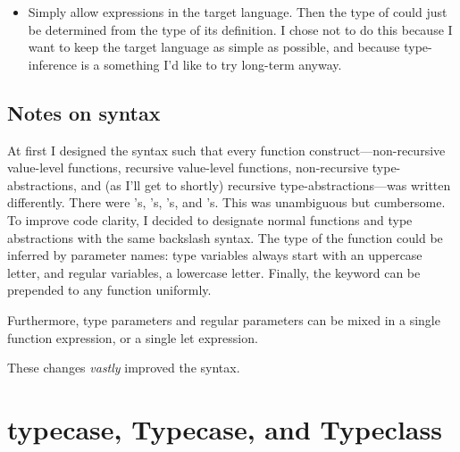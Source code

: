 \documentclass[pageno]{jpaper}
\begin{document}
{{{\begin{itemize}
\begin{lstlisting}
  (\ f => f 73 5)
    (\ (x:Int) (\ (y:Int) => x + y))
\end{lstlisting}

the type inference algorithm would figure out that  must have type  because
 has type .
\item Simply allow  expressions in the target language.  Then the type of  could
just be determined from the type of its definition. I chose not to do this because I want to keep the
target language as simple as possible, and because type-inference is a something I'd like to try long-term
anyway.

\end{itemize}

\subsection{Notes on syntax}

At first I designed the syntax such that every function construct---non-recursive value-level functions, recursive value-level functions, non-recursive type-abstractions, and (as I'll get to shortly) recursive type-abstractions---was written differently. There were 's, 's, 's, and
's. This was unambiguous but cumbersome. To improve code clarity, I decided to
designate normal functions and type abstractions with the same backslash syntax.
The type of the function could be inferred by parameter names: type variables always start with an
uppercase letter, and regular variables, a lowercase letter. Finally, the  keyword can be
prepended to any function uniformly.

Furthermore, type parameters and regular parameters can be mixed in a single function expression,
or a single let expression.

These changes \textit{vastly} improved the syntax.

\section{typecase, Typecase, and Typeclass}

}}}
\end{document}
